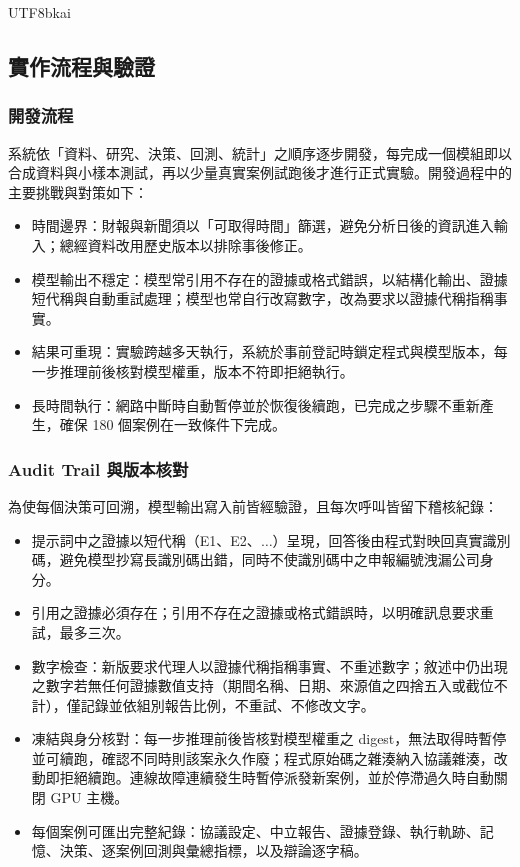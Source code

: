 \documentclass[12pt,a4paper]{article}
\begin{document}
\begin{CJK}{UTF8}{bkai}
\subsection{實作流程與驗證}

\subsubsection{開發流程}
系統依「資料、研究、決策、回測、統計」之順序逐步開發，每完成一個模組即以合成資料與小樣本測試，再以少量真實案例試跑後才進行正式實驗。開發過程中的主要挑戰與對策如下：

\begin{itemize}
  \item 時間邊界：財報與新聞須以「可取得時間」篩選，避免分析日後的資訊進入輸入；總經資料改用歷史版本以排除事後修正。
  \item 模型輸出不穩定：模型常引用不存在的證據或格式錯誤，以結構化輸出、證據短代稱與自動重試處理；模型也常自行改寫數字，改為要求以證據代稱指稱事實。
  \item 結果可重現：實驗跨越多天執行，系統於事前登記時鎖定程式與模型版本，每一步推理前後核對模型權重，版本不符即拒絕執行。
  \item 長時間執行：網路中斷時自動暫停並於恢復後續跑，已完成之步驟不重新產生，確保 180 個案例在一致條件下完成。
\end{itemize}
\subsubsection{Audit Trail 與版本核對}
為使每個決策可回溯，模型輸出寫入前皆經驗證，且每次呼叫皆留下稽核紀錄：

\begin{itemize}
  \item 提示詞中之證據以短代稱（E1、E2、$\ldots$）呈現，回答後由程式對映回真實識別碼，避免模型抄寫長識別碼出錯，同時不使識別碼中之申報編號洩漏公司身分。
  \item 引用之證據必須存在；引用不存在之證據或格式錯誤時，以明確訊息要求重試，最多三次。
  \item 數字檢查：新版要求代理人以證據代稱指稱事實、不重述數字；敘述中仍出現之數字若無任何證據數值支持（期間名稱、日期、來源值之四捨五入或截位不計），僅記錄並依組別報告比例，不重試、不修改文字。
  \item 凍結與身分核對：每一步推理前後皆核對模型權重之 digest，無法取得時暫停並可續跑，確認不同時則該案永久作廢；程式原始碼之雜湊納入協議雜湊，改動即拒絕續跑。連線故障連續發生時暫停派發新案例，並於停滯過久時自動關閉 GPU 主機。
  \item 每個案例可匯出完整紀錄：協議設定、中立報告、證據登錄、執行軌跡、記憶、決策、逐案例回測與彙總指標，以及辯論逐字稿。
\end{itemize}

\end{CJK}
\end{document}
